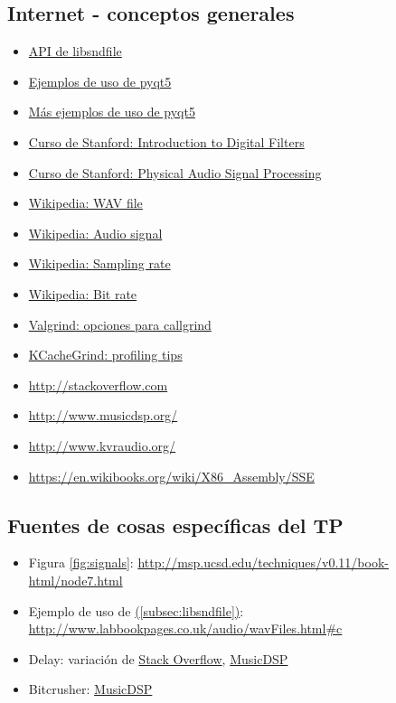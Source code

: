 \documentclass[a4paper,spanish,12pt]{article}
\newcommand*{\fullref}[1]{\hyperref[{#1}]{\nameref*{#1} (\autoref*{#1})}} %
\begin{document}
\subsection{Internet - conceptos generales}
\begin{itemize}
\item \href{http://www.mega-nerd.com/libsndfile/api.html}{API de libsndfile}
\item \href{http://zetcode.com/gui/pyqt5/}{Ejemplos de uso de pyqt5}
\item \href{https://github.com/shuge/Qt-Python-Binding-Examples}{Más ejemplos de uso de pyqt5}
\item \href{https://ccrma.stanford.edu/~jos/}{Curso de Stanford: Introduction to Digital Filters}
\item \href{https://ccrma.stanford.edu/~jos/pasp/}{Curso de Stanford: Physical Audio Signal Processing}
\item \href{https://en.wikipedia.org/wiki/WAV}{Wikipedia: WAV file}
\item \href{https://en.wikipedia.org/wiki/Audio_signal}{Wikipedia: Audio signal}
\item \href{http://en.wikipedia.org/wiki/Sampling_rate}{Wikipedia: Sampling rate}
\item \href{https://en.wikipedia.org/wiki/Bit_rate}{Wikipedia: Bit rate}
\item \href{http://valgrind.org/docs/manual/cl-manual.html}{Valgrind: opciones para callgrind}
\item \href{http://kcachegrind.sourceforge.net/html/Tips.html}{KCacheGrind: profiling tips}
\item \url{http://stackoverflow.com}
\item \url{http://www.musicdsp.org/}
\item \url{http://www.kvraudio.org/}
\item \url{https://en.wikibooks.org/wiki/X86_Assembly/SSE}
\end{itemize}

\subsection{Fuentes de cosas específicas del TP}
\begin{itemize}
\item Figura \ref{fig:signals}: \url{http://msp.ucsd.edu/techniques/v0.11/book-html/node7.html}
\item Ejemplo de uso de \fullref{subsec:libsndfile}: \url{http://www.labbookpages.co.uk/audio/wavFiles.html#c}
\item Delay: variación de \href{http://stackoverflow.com/questions/5318989/reverb-algorithm}{Stack Overflow}, \href{http://www.musicdsp.org/showArchiveComment.php?ArchiveID=153}{MusicDSP}
\item Bitcrusher: \href{http://www.musicdsp.org/showArchiveComment.php?ArchiveID=139}{MusicDSP}
\end{itemize}
\end{document}
